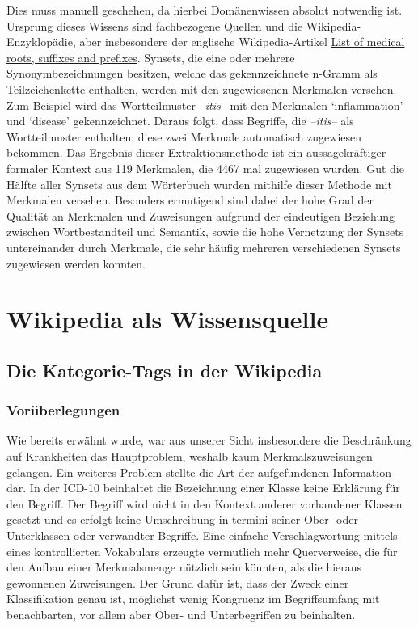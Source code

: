 \documentclass[pagesize,DIV=calc,12pt,draft]{scrreprt}
\begin{document}
Dies muss manuell geschehen, da hierbei Domänenwissen absolut notwendig ist. 
Ursprung dieses Wissens sind fachbezogene Quellen und die Wikipedia-Enzyklopädie, aber insbesondere der englische Wikipedia-Artikel \href{http://en.wikipedia.org/wiki/List_of_medical_roots,_suffixes_and_prefixes}{List of medical roots, suffixes and prefixes}. 
Synsets, die eine oder mehrere Synonymbezeichnungen besitzen, welche das gekennzeichnete n-Gramm als Teilzeichenkette enthalten, werden mit den zugewiesenen Merkmalen versehen. 
Zum Beispiel wird das Wortteilmuster \emph{--itis--} mit den Merkmalen `inflammation' und `disease' gekennzeichnet. 
Daraus folgt, dass Begriffe, die \emph{--itis--} als Wortteilmuster enthalten, diese zwei Merkmale automatisch zugewiesen bekommen. 
Das Ergebnis dieser Extraktionsmethode ist ein aussagekräftiger formaler Kontext aus 119 Merkmalen, die 4467 mal zugewiesen wurden. 
Gut die Hälfte aller Synsets aus dem Wörterbuch wurden mithilfe dieser Methode mit Merkmalen versehen. 
Besonders ermutigend sind dabei der hohe Grad der Qualität an Merkmalen und Zuweisungen aufgrund der eindeutigen Beziehung zwischen Wortbestandteil und Semantik, sowie die hohe Vernetzung der Synsets untereinander durch Merkmale, die sehr häufig mehreren verschiedenen Synsets zugewiesen werden konnten. 

\section{Wikipedia als Wissensquelle}

\subsection{Die Kategorie-Tags in der Wikipedia}

\subsubsection{Vorüberlegungen}

Wie bereits erwähnt wurde, war aus unserer Sicht insbesondere die Beschränkung auf Krankheiten das Hauptproblem, weshalb kaum Merkmalszuweisungen gelangen. 
Ein weiteres Problem stellte die Art der aufgefundenen Information dar. 
In der ICD-10 beinhaltet die Bezeichnung einer Klasse keine Erklärung für den Begriff. 
Der Begriff wird nicht in den Kontext anderer vorhandener Klassen gesetzt und es erfolgt keine Umschreibung in termini seiner Ober- oder Unterklassen oder verwandter Begriffe. 
Eine einfache Verschlagwortung mittels eines kontrollierten Vokabulars erzeugte vermutlich mehr Querverweise, die für den Aufbau einer Merkmalsmenge nützlich sein könnten, als die hieraus gewonnenen Zuweisungen. 
Der Grund dafür ist, dass der Zweck einer Klassifikation genau ist, möglichst wenig Kongruenz im Begriffsumfang mit benachbarten, vor allem aber Ober- und Unterbegriffen zu beinhalten. 
\end{document}
